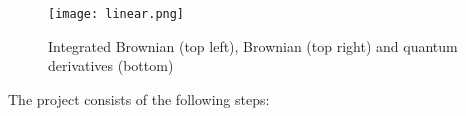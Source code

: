 \documentclass[oneside,10pt]{book}
\begin{document}


\begin{figure}[H]
\centering
\texttt{[image: linear.png]}  
\caption{Integrated Brownian (top left), Brownian (top right) and quantum derivatives (bottom)}
\label{fig:lollog1xx}
\end{figure}











\noindent The project consists of the following steps: \vspace{1ex}
\end{document}
